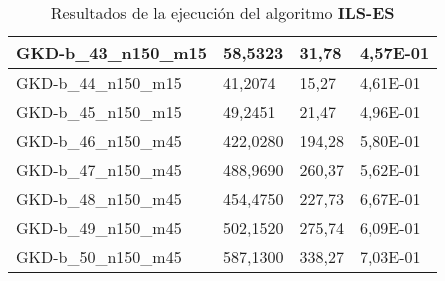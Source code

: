 \begin{table}[!ht]
\begin{adjustbox}{height=12cm}
\begin{tabular}{|l|l|l|l|}
        GKD-b\_43\_n150\_m15 & 58,5323  & 31,78         & 4,57E-01 \\ \hline
        GKD-b\_44\_n150\_m15 & 41,2074  & 15,27         & 4,61E-01 \\ \hline
        GKD-b\_45\_n150\_m15 & 49,2451  & 21,47         & 4,96E-01 \\ \hline
        GKD-b\_46\_n150\_m45 & 422,0280 & 194,28        & 5,80E-01 \\ \hline
        GKD-b\_47\_n150\_m45 & 488,9690 & 260,37        & 5,62E-01 \\ \hline
        GKD-b\_48\_n150\_m45 & 454,4750 & 227,73        & 6,67E-01 \\ \hline
        GKD-b\_49\_n150\_m45 & 502,1520 & 275,74        & 6,09E-01 \\ \hline
        GKD-b\_50\_n150\_m45 & 587,1300 & 338,27        & 7,03E-01 \\ \hline
    \end{tabular}
    \end{adjustbox}
    \caption{Resultados de la ejecución del algoritmo \textbf{ILS-ES}}
\end{table}

\pagebreak